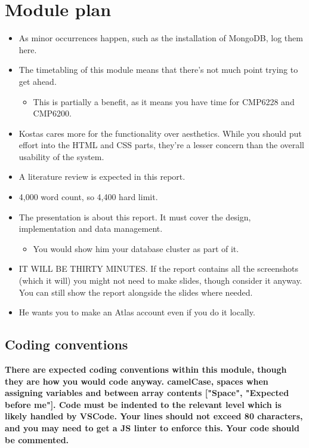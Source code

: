 \documentclass[12pt]{report}
\begin{document}
\chapter*{Module plan}
\begin{itemize}
    \item As minor occurrences happen, such as the installation of MongoDB, log them here.
    \item The timetabling of this module means that there's not much point trying to get ahead.
    \begin{itemize}
        \item This is partially a benefit, as it means you have time for CMP6228 and CMP6200.
    \end{itemize}
    \item Kostas cares more for the functionality over aesthetics. While you should put effort into 
    the HTML and CSS parts, they're a lesser concern than the overall usability of the system.
    \item A literature review is expected in this report.
    \item 4,000 word count, so 4,400 hard limit.
    \item The presentation is about this report. It must cover the design, implementation and data management.
    \begin{itemize}
        \item You would show him your database cluster as part of it.
    \end{itemize}
    \item IT WILL BE THIRTY MINUTES. If the report contains all the screenshots (which it will) you might not need 
    to make slides, though consider it anyway. You can still show the report alongside the slides where needed.
    \item He wants you to make an Atlas account even if you do it locally. 
\end{itemize}

\section*{Coding conventions}

\textbf{There are expected coding conventions within this module, though they are how you would 
code anyway. camelCase, spaces when assigning variables and between array contents ["Space", "Expected before me"].
Code must be indented to the relevant level which is likely handled by VSCode. Your lines should not exceed 
80 characters, and you may need to get a JS linter to enforce this. Your code should be commented.}
\end{document}
